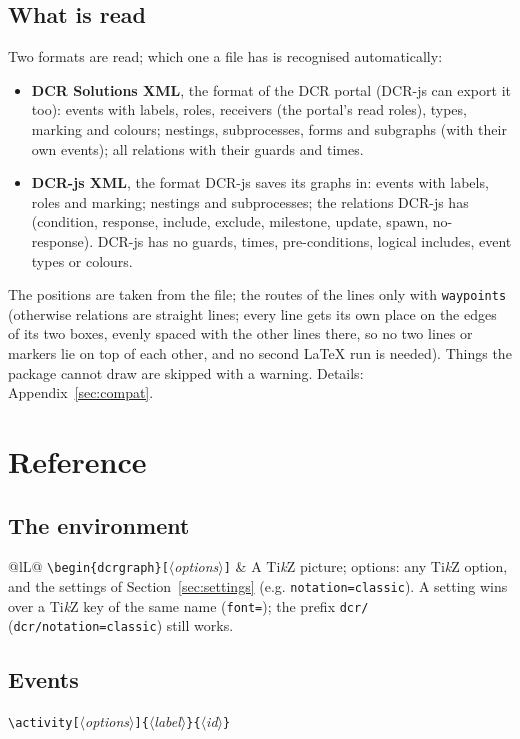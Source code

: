 \documentclass[a4paper,11pt]{article}
\newcommand\cs[1]{\texttt{\textbackslash#1}}
\newcommand\key[1]{\texttt{#1}}
\newcommand\meta[1]{\ensuremath{\langle}\textit{#1}\ensuremath{\rangle}}
\newcommand\marg[1]{\texttt{\{}\meta{#1}\texttt{\}}}
\newcommand\oarg[1]{\texttt{[}\meta{#1}\texttt{]}}
\begin{document}
\subsection{What is read}
Two formats are read; which one a file has is recognised automatically:
\begin{itemize}
  \item \textbf{DCR Solutions XML}, the format of the DCR portal (DCR-js can
    export it too): events with labels, roles, receivers (the portal's
    read roles), types, marking and colours;
    nestings, subprocesses, forms and subgraphs (with their own events); all
    relations with their guards and times.
  \item \textbf{DCR-js XML}, the format DCR-js saves its graphs in: events
    with labels, roles and marking; nestings and subprocesses; the
    relations DCR-js has (condition, response, include,
    exclude, milestone, update, spawn, no-response). DCR-js has no guards,
    times, pre-conditions, logical includes, event types or colours.
\end{itemize}
The positions are taken from the file; the routes of the lines only with
\key{waypoints} (otherwise relations are straight lines; every line gets
its own place on the edges of its two boxes, evenly spaced with the other
lines there, so no two lines or markers lie on top of each other, and no
second \LaTeX{} run is needed). Things the package cannot draw are skipped with a
warning. Details: Appendix~\ref{sec:compat}.

\section{Reference}

\subsection{The environment}
\begin{tabularx}{\linewidth}{@{}lL@{}}
\toprule
\cs{begin\{dcrgraph\}}\oarg{options} & A Ti\emph{k}Z picture; options:
  any Ti\emph{k}Z option, and the settings of Section~\ref{sec:settings}
  (e.g. \key{notation=classic}). A setting wins over a Ti\emph{k}Z key of
  the same name (\key{font=}); the prefix \key{dcr/}
  (\key{dcr/notation=classic}) still works.\\
\bottomrule
\end{tabularx}

\subsection{Events}
\cs{activity}\oarg{options}\marg{label}\marg{id}
\end{document}
